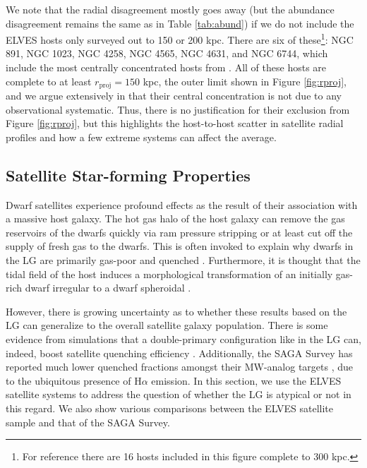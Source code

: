 \documentclass[twocolumn]{aastex62}
\begin{document}
We note that the radial disagreement mostly goes away (but the abundance disagreement remains the same as in Table \ref{tab:abund}) if we do not include the ELVES hosts only surveyed out to 150 or 200 kpc. There are six of these\footnote{For reference there are 16 hosts included in this figure complete to 300 kpc.}: NGC 891, NGC 1023, NGC 4258, NGC 4565, NGC 4631, and NGC 6744, which include the most centrally concentrated hosts from \citet{carlsten2020c}. All of these hosts are complete to at least $r_\mathrm{proj}=150$ kpc, the outer limit shown in Figure \ref{fig:rproj}, and we argue extensively in \citet{carlsten2020c} that their central concentration is not due to any observational systematic. Thus, there is no justification for their exclusion from Figure \ref{fig:rproj}, but this highlights the host-to-host scatter in satellite radial profiles and how a few extreme systems can affect the average.





















\subsection{Satellite Star-forming Properties}
\label{sec:sat_sf}
Dwarf satellites experience profound effects as the result of their association with a massive host galaxy. The hot gas halo of the host galaxy can remove the gas reservoirs of the dwarfs quickly via ram pressure stripping \citep{gunn1972, grebel2003, boselli2008} or at least cut off the supply of fresh gas to the dwarfs. This is often invoked to explain why dwarfs in the LG are primarily gas-poor and quenched \citep{grcevich2009, spekkens2014, putman2021}. Furthermore, it is thought that the tidal field of the host induces a morphological transformation of an initially gas-rich dwarf irregular to a dwarf spheroidal \citep[e.g.][]{mayer2006, kazantzidis2011, kazantzidis2013}. 

However, there is growing uncertainty as to whether these results based on the LG can generalize to the overall satellite galaxy population. There is some evidence from simulations that a double-primary configuration like in the LG can, indeed, boost satellite quenching efficiency \citep{gk2019b}. Additionally, the SAGA Survey has reported much lower quenched fractions amongst their MW-analog targets \citep{geha2017, mao2020}, due to the ubiquitous presence of H$\alpha$ emission. In this section, we use the ELVES satellite systems to address the question of whether the LG is atypical or not in this regard. We also show various comparisons between the ELVES satellite sample and that of the SAGA Survey. 
\end{document}

